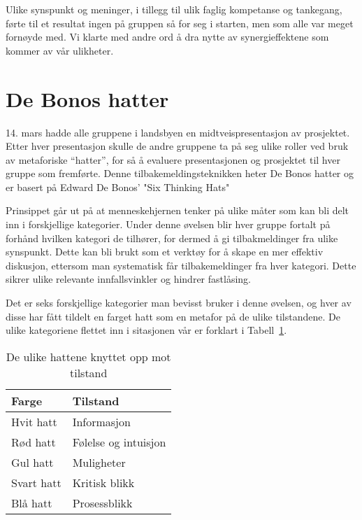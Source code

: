 Ulike synspunkt og meninger, i tillegg til ulik faglig kompetanse og tankegang, førte til et resultat ingen på gruppen så for seg i starten, men som alle var meget fornøyde med. Vi klarte med andre ord å dra nytte av synergieffektene som kommer av vår ulikheter.



\section{De Bonos hatter} %
14. mars hadde alle gruppene i landsbyen en midtveispresentasjon av prosjektet. Etter hver presentasjon skulle de andre gruppene ta på seg ulike roller ved bruk av metaforiske “hatter”, for så å evaluere presentasjonen og prosjektet til hver gruppe som fremførte. Denne tilbakemeldingsteknikken heter De Bonos hatter og er basert på Edward De Bonos' "Six Thinking Hats" \cite{bonos}

Prinsippet går ut på at menneskehjernen tenker på ulike måter som kan
bli delt inn i forskjellige kategorier. Under denne øvelsen blir hver
gruppe fortalt på forhånd hvilken kategori de tilhører, for dermed å gi
tilbakmeldinger fra ulike synspunkt. Dette kan bli brukt som et verktøy
for å skape en mer effektiv diskusjon, ettersom man systematisk får
tilbakemeldinger fra hver kategori. Dette sikrer ulike relevante
innfallsvinkler og hindrer fastlåsing.

Det er seks forskjellige kategorier man bevisst bruker i denne øvelsen,
og hver av disse har fått tildelt en farget hatt som en metafor på de
ulike tilstandene. De ulike kategoriene flettet inn i sitasjonen vår er
forklart i Tabell~\ref{tab:hats}.
\\
\begin{table} [H]
\centering
\begin{tabular}{| l | l |}
\hline
\bf{Farge} & \bf{Tilstand} \\
\hline
Hvit hatt & Informasjon \\
Rød hatt & Følelse og intuisjon \\
Gul hatt & Muligheter \\
Svart hatt & Kritisk blikk \\
Blå hatt & Prosessblikk \\
\hline
\end{tabular}
\caption{De ulike hattene knyttet opp mot tilstand}
\label{tab:hats}
\end{table}

\vspace{1.0em}

